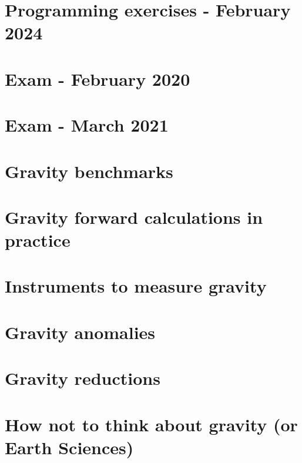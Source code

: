 \section{Programming exercises - February 2024 \label{exgravptmass}} 

\newpage
\section{Exam - February 2020} 
\newpage
\section{Exam - March 2021} 


\section{Gravity benchmarks} 

\newpage
\section{Gravity forward calculations in practice} 
\section{Instruments to measure gravity} 
\section{Gravity anomalies} 
\section{Gravity reductions} 
\section{How not to think about gravity (or Earth Sciences)} 
